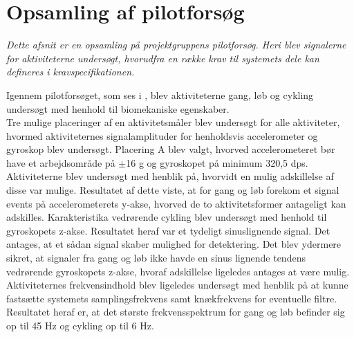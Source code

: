 \section{Opsamling af pilotforsøg}\label{opsamling_pilot}
\textit{Dette afsnit er en opsamling på projektgruppens pilotforsøg. Heri blev signalerne for aktiviteterne undersøgt, hvorudfra en række krav til systemets dele kan defineres i kravspecifikationen.}

Igennem pilotforsøget, som ses i , blev aktiviteterne gang, løb og cykling undersøgt med henhold til biomekaniske egenskaber. \\
Tre mulige placeringer af en aktivitetsmåler blev undersøgt for alle aktiviteter, hvormed aktiviteternes signalamplituder for henholdsvis accelerometer og gyroskop blev undersøgt. Placering A blev valgt, hvorved accelerometeret bør have et arbejdsområde på $\pm$16 g og gyroskopet på minimum 320,5 dps. \\
Aktiviteterne blev undersøgt med henblik på, hvorvidt en mulig adskillelse af disse var mulige. Resultatet af dette viste, at for gang og løb forekom et signal events på accelerometerets y-akse, hvorved de to aktivitetsformer antageligt kan adskilles. Karakteristika vedrørende cykling blev undersøgt med henhold til gyroskopets z-akse. Resultatet heraf var et tydeligt sinuslignende signal. Det antages, at et sådan signal skaber mulighed for detektering. Det blev ydermere sikret, at signaler fra gang og løb ikke havde en sinus lignende tendens vedrørende gyroskopets z-akse, hvoraf adskillelse ligeledes antages at være mulig. \\
Aktiviteternes frekvensindhold blev ligeledes undersøgt med henblik på at kunne fastsætte systemets samplingsfrekvens samt knækfrekvens for eventuelle filtre. Resultatet heraf er, at det største frekvensspektrum for gang og løb befinder sig op til 45 Hz og cykling op til 6 Hz. 

